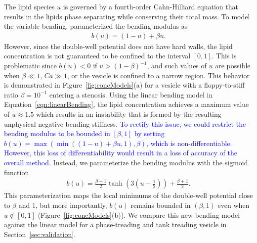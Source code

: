 \documentclass[twoside,twocolumn,9pt]{article}
\begin{document}
The lipid species $u$ is governed by a fourth-order Cahn-Hilliard
equation that results in the lipids phase separating while conserving
their total mass. To model the variable bending,
\citet{soh-tse-li-voi-low2010} parameterized the bending modulus as
\begin{align}
  \label{eqn:linearBending}
  b(u) = (1-u) + \beta u.
\end{align}
However, since the double-well potential does not have hard walls, the
lipid concentration is not guaranteed to be confined to the interval
$[0,1]$. This is problematic since $b(u) < 0$ if $u > (1 - \beta)^{-1}$,
and such values of $u$ are possible when $\beta \ll 1$, $Ca \gg 1$, or
the vesicle is confined to a narrow region. This behavior is
demonstrated in Figure~\ref{fig:concModels}(a) for a vesicle with a
floppy-to-stiff ratio $\beta = 10^{-1}$ entering a stenosis. Using the
linear bending model in Equation~\eqref{eqn:linearBending}, the lipid
concentration achieves a maximum value of $u \approx 1.5$ which results
in an instability that is formed by the resulting unphysical negative
bending stiffness. 
\textcolor{blue}{
To rectify this issue, we could restrict the bending modulus to be
bounded in $[\beta,1]$ by setting $b(u) = \max\left( \min \left( (1-u) +
\beta u,1 \right), \beta \right)$, which is non-differentiable. However,
this loss of differentiability would result in a loss of accuracy of the
overall method.
}
Instead, we parameterize the bending modulus with the sigmoid function
\begin{align}
  b(u) = \frac{\beta-1}{2} \tanh\left(3\left(u-\frac{1}{2} 
    \right)\right) + \frac{\beta + 1}{2}.
  \label{eqn:tanhBending}
\end{align}
This parameterization maps the local minimums of the double-well
potential close to $\beta$ and $1$, but more importantly, $b(u)$ remains
bounded in $(\beta,1)$ even when $u \notin [0,1]$
(Figure~\ref{fig:concModels}(b)). We compare this new bending model
against the linear model for a phase-treading and tank treading vesicle
in Section~\ref{sec:validation}.

\end{document}
